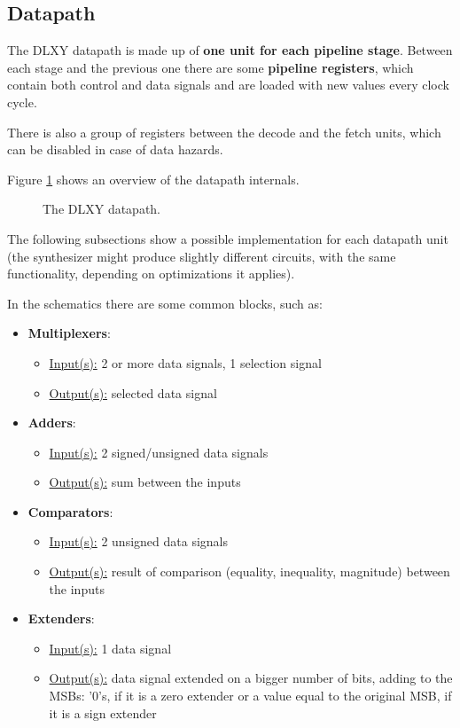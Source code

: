 \subsection{Datapath}
The DLXY datapath is made up of \textbf{one unit for each pipeline stage}.
Between each stage and the previous one there are some \textbf{pipeline registers},
which contain both control and data signals and are loaded with new values every
clock cycle.

There is also a group of registers between the decode and the fetch units, which
can be disabled in case of data hazards.

\bigskip
Figure \ref{fig:datapath} shows an overview of the datapath internals.

\begin{figure}[H]
	\centering
	\caption{The DLXY datapath.}
	\label{fig:datapath}
\end{figure}

\bigskip
The following subsections show a possible implementation for each datapath unit
(the synthesizer might produce slightly different circuits, with the same
functionality, depending on optimizations it applies).

\bigskip
In the schematics there are some common blocks, such as:
\begin{itemize}
	\item \textbf{Multiplexers}:
		\begin{itemize}
			\item \underline{Input(s):} 2 or more data signals,
				1 selection signal
			\item \underline{Output(s):} selected data signal
		\end{itemize}
	\item \textbf{Adders}:
		\begin{itemize}
			\item \underline{Input(s):} 2 signed/unsigned data signals
			\item \underline{Output(s):} sum between the inputs
		\end{itemize}
	\item \textbf{Comparators}:
		\begin{itemize}
			\item \underline{Input(s):} 2 unsigned data signals
			\item \underline{Output(s):} result of comparison
				(equality, inequality, magnitude) between the
				inputs
		\end{itemize}
	\item \textbf{Extenders}:
		\begin{itemize}
			\item \underline{Input(s):} 1 data signal
			\item \underline{Output(s):} data signal extended on
				a bigger number of bits, adding to the MSBs:
				'0's, if it is a zero extender or a value equal
				to the original MSB, if it is a sign extender
		\end{itemize}
\end{itemize}

